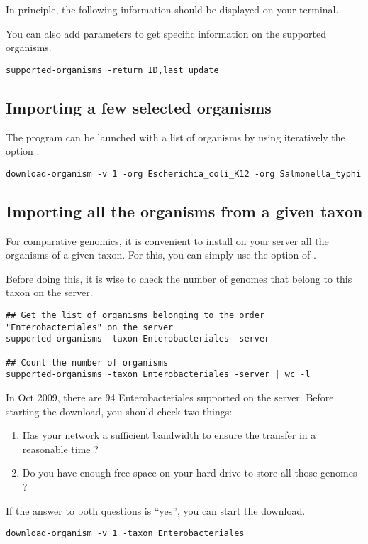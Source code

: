 In principle, the following information should be displayed on your
terminal.


You can also add parameters to get specific information on the
supported organisms.

\begin{lstlisting}
supported-organisms -return ID,last_update
\end{lstlisting}


\subsection{Importing a few selected organisms}

The program  can be launched with a list of
organisms by using iteratively the option .


\begin{lstlisting}
download-organism -v 1 -org Escherichia_coli_K12 -org Salmonella_typhi
\end{lstlisting}

\subsection{Importing all the organisms from a given taxon}

For comparative genomics, it is convenient to install on your server
all the organisms of a given taxon. For this, you can simply use the
option  of .

Before doing this, it is wise to check the number of genomes that
belong to this taxon on the server.

\begin{lstlisting}
## Get the list of organisms belonging to the order "Enterobacteriales" on the server
supported-organisms -taxon Enterobacteriales -server

## Count the number of organisms
supported-organisms -taxon Enterobacteriales -server | wc -l
\end{lstlisting}

In Oct 2009, there are 94 Enterobacteriales supported on the \RSAT
server. Before starting the download, you should check two things:
\begin{enumerate}
\item Has your network a sufficient bandwidth to ensure the transfer
  in a reasonable time ?
\item Do you have enough free space on your hard drive to store all those genomes ? 
\end{enumerate}

If the answer to both questions is ``yes'', you can start the
download.

\begin{lstlisting}
download-organism -v 1 -taxon Enterobacteriales 
\end{lstlisting}


